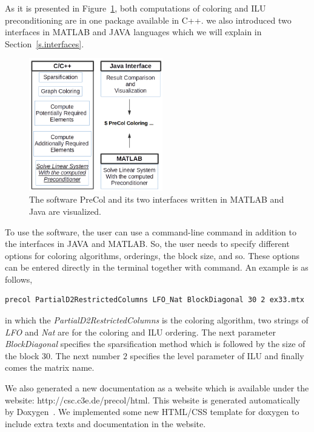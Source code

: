 \documentclass[12pt, twoside,a4paper,toc=bibliography]{scrbook}
\newcommand{\figref}[1]{Figure~\protect\ref{#1}}
\begin{document}
As it is presented in \figref{f.structure}, both computations of coloring and ILU preconditioning
are in one package available in C++. we also introduced
two interfaces in MATLAB and JAVA languages which we will explain in
Section~\ref{s.interfaces}.
\begin{figure}
\centering
\includegraphics[width=0.52\textwidth]{new_struct}
\caption{
The software PreCol and its two interfaces written in MATLAB and Java are visualized.}
\label{f.structure}
\end{figure}

To use the software, the user can use a command-line command in addition to
the interfaces in JAVA and MATLAB. So, the user needs to specify different
options for coloring algorithms, orderings, the block size, and so.
These options can be entered directly in the terminal together with command.
An example is as follows,
\begin{lstlisting}
precol PartialD2RestrictedColumns LFO_Nat BlockDiagonal 30 2 ex33.mtx
\end{lstlisting}
in which the \textit{PartialD2RestrictedColumns} is the coloring algorithm,
two strings of \textit{LFO} and \textit{Nat} are for the coloring and ILU ordering.
The next parameter \textit{BlockDiagonal} specifies the sparsification method
which is followed by the size of the block $30$. The next number $2$ specifies
the level parameter of ILU and finally comes the matrix name.

We also generated a new documentation as a website which is available
under the website: http://csc.c3e.de/precol/html.
This website is generated automatically by Doxygen~\cite{Lischner2013}.
We implemented some new HTML/CSS template for doxygen to include extra
texts and documentation in the website.
\end{document}
